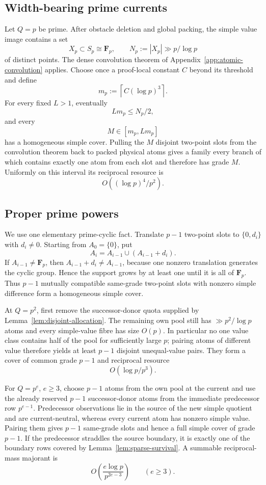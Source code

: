 \subsection{Width-bearing prime currents}

Let $Q=p$ be prime.  After obstacle deletion and global packing, the simple
value image contains a set
\[
X_p\subset S_p\cong\mathbf F_p,
\qquad
N_p:=|X_p|\gg p/\log p
\]
of distinct points.  The dense convolution theorem of
Appendix~\ref{app:atomic-convolution} applies.  Choose once a proof-local
constant $C$ beyond its threshold and define
\[
\boxed{
m_p:=\left\lceil C(\log p)^3\right\rceil.}
\tag{T6}\label{eq:mp-definition}
\]
For every fixed $L>1$, eventually
\[
Lm_p\le N_p/2,
\]
and every
\[
M\in[m_p,Lm_p]
\tag{T7}\label{eq:atomic-grade-interval}
\]
has a homogeneous simple cover.  Pulling the $M$ disjoint two-point slots from
the convolution theorem back to packed physical atoms gives a family every
branch of which contains exactly one atom from each slot and therefore has
grade $M$.  Uniformly on this interval its reciprocal resource is
\[
O((\log p)^4/p^2).
\tag{T8}\label{eq:atomic-resource}
\]

\subsection{Proper prime powers}

We use one elementary prime-cyclic fact.  Translate $p-1$ two-point slots to
$\{0,d_i\}$ with $d_i\ne0$.  Starting from $A_0=\{0\}$, put
\[
A_i=A_{i-1}\cup(A_{i-1}+d_i).
\]
If $A_{i-1}\ne\mathbf F_p$, then $A_{i-1}+d_i\ne A_{i-1}$, because one
nonzero translation generates the cyclic group.  Hence the support grows by at
least one until it is all of $\mathbf F_p$.  Thus $p-1$ mutually compatible
same-grade two-point slots with nonzero simple difference form a homogeneous
simple cover.

At $Q=p^2$, first remove the successor-donor quota supplied by
Lemma~\ref{lem:disjoint-allocation}.  The remaining own pool still has
$\gg p^2/\log p$ atoms and every simple-value fibre has size $O(p)$.  In
particular no one value class contains half of the pool for sufficiently large
$p$; pairing atoms of different value therefore yields at least $p-1$
disjoint unequal-value pairs.  They form a cover of common grade $p-1$ and
reciprocal resource
\[
O(\log p/p^3).
\tag{T9}\label{eq:square-resource}
\]

For $Q=p^e$, $e\ge3$, choose $p-1$ atoms from the own pool at the current and
use the already reserved $p-1$ successor-donor atoms from the immediate
predecessor row $p^{e-1}$.  Predecessor observations lie in the source of the
new simple quotient and are current-neutral, whereas every current atom has
nonzero simple value.  Pairing them gives $p-1$ same-grade slots and hence a
full simple cover of grade $p-1$.  If the predecessor straddles the source
boundary, it is exactly one of the boundary rows covered by
Lemma~\ref{lem:sparse-survival}.  A summable reciprocal-mass majorant is
\[
O\!\left(\frac{e\log p}{p^{2e-3}}\right)
\qquad(e\ge3).
\tag{T10}\label{eq:deep-resource}
\]

